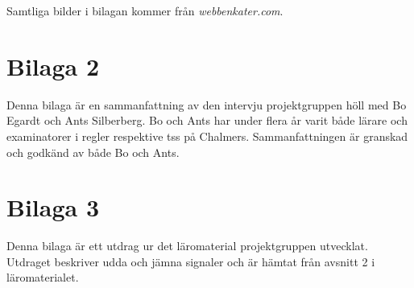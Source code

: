 \documentclass[12pt,a4paper,twoside,openright]{article}
\begin{document}
Samtliga bilder i bilagan kommer från \textit{webbenkater.com}.

\newpage

\section{Bilaga 2}
\label{bil:exam_intervju}
Denna bilaga är en sammanfattning av den intervju projektgruppen höll
med Bo Egardt och Ants Silberberg. Bo och Ants har under flera år
varit både lärare och examinatorer i \gls{regler} respektive \gls{tss}
på Chalmers. Sammanfattningen är granskad och godkänd av både Bo och
Ants.


\newpage

\section{Bilaga 3}
\label{bil:3}
Denna bilaga är ett utdrag ur det läromaterial projektgruppen
utvecklat. Utdraget beskriver udda och jämna signaler och är hämtat
från avsnitt 2 i läromaterialet.


\end{document}
